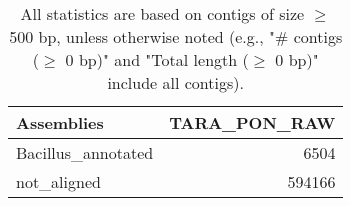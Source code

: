 \documentclass[12pt,a4paper]{article}
\begin{document}
\begin{table}[ht]
\begin{center}
\caption{All statistics are based on contigs of size $\geq$ 500 bp, unless otherwise noted (e.g., "\# contigs ($\geq$ 0 bp)" and "Total length ($\geq$ 0 bp)" include all contigs).}
\begin{tabular}{|l*{1}{|r}|}
\hline
Assemblies & TARA\_PON\_RAW \\ \hline
Bacillus\_annotated & 6504 \\ \hline
not\_aligned & 594166 \\ \hline
\end{tabular}
\end{center}
\end{table}
\end{document}

